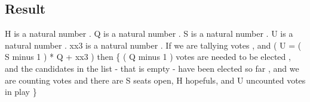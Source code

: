 \subsection{Result}
\begin{texto2}
	H is a natural number . Q is a natural number . S is a natural number . U is a natural number . xx3 is a natural number . If we are tallying votes , and ( U = ( S minus 1 ) * Q + xx3 ) then \{ ( Q minus 1 ) votes are needed to be elected , and the candidates in the list - that is empty - have been elected so far , and we are counting votes and there are S seats open, H hopefuls, and U uncounted votes in play \}
\end{texto2}